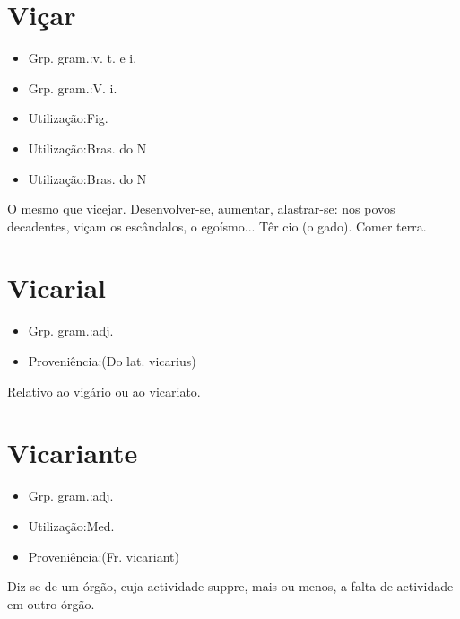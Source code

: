 \documentclass{article}
\begin{document}
\section{Viçar}
\begin{itemize}
\item {Grp. gram.:v. t.  e  i.}
\end{itemize}
\begin{itemize}
\item {Grp. gram.:V. i.}
\end{itemize}
\begin{itemize}
\item {Utilização:Fig.}
\end{itemize}
\begin{itemize}
\item {Utilização:Bras. do N}
\end{itemize}
\begin{itemize}
\item {Utilização:Bras. do N}
\end{itemize}
O mesmo que \textunderscore vicejar\textunderscore .
Desenvolver-se, aumentar, alastrar-se: \textunderscore nos povos decadentes, viçam os escândalos, o egoísmo...\textunderscore 
Têr cio (o gado).
Comer terra.
\section{Vicarial}
\begin{itemize}
\item {Grp. gram.:adj.}
\end{itemize}
\begin{itemize}
\item {Proveniência:(Do lat. \textunderscore vicarius\textunderscore )}
\end{itemize}
Relativo ao vigário ou ao vicariato.
\section{Vicariante}
\begin{itemize}
\item {Grp. gram.:adj.}
\end{itemize}
\begin{itemize}
\item {Utilização:Med.}
\end{itemize}
\begin{itemize}
\item {Proveniência:(Fr. \textunderscore vicariant\textunderscore )}
\end{itemize}
Diz-se de um órgão, cuja actividade suppre, mais ou menos, a falta de actividade em outro órgão.
\end{document}
